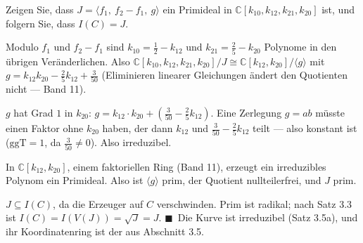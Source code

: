\begin{aufgabe}
Zeigen Sie, dass $J = \langle f_1,\ f_2 - f_1,\ g\rangle$ ein Primideal in $\mathbb C[k_{10}, k_{12}, k_{21}, k_{20}]$ ist, und folgern Sie, dass $I(C) = J$.

\loesung
{}
Modulo $f_1$ und $f_2 - f_1$ sind $k_{10} = \tfrac12 - k_{12}$ und $k_{21} = \tfrac25 - k_{20}$ Polynome in den übrigen Veränderlichen. Also $\mathbb C[k_{10}, k_{12}, k_{21}, k_{20}]/J\cong\mathbb C[k_{12}, k_{20}]/\langle g\rangle$ mit $g = k_{12}k_{20} - \tfrac25k_{12} + \tfrac{3}{50}$ (Eliminieren linearer Gleichungen ändert den Quotienten nicht --- Band 11).

$g$ hat Grad $1$ in $k_{20}$: $g = k_{12}\cdot k_{20} + (\tfrac{3}{50} - \tfrac25k_{12})$. Eine Zerlegung $g = ab$ müsste einen Faktor ohne $k_{20}$ haben, der dann $k_{12}$ und $\tfrac{3}{50} - \tfrac25k_{12}$ teilt --- also konstant ist ($\mathrm{ggT} = 1$, da $\tfrac{3}{50}\ne0$). Also irreduzibel.

In $\mathbb C[k_{12}, k_{20}]$, einem faktoriellen Ring (Band 11), erzeugt ein irreduzibles Polynom ein Primideal. Also ist $\langle g\rangle$ prim, der Quotient nullteilerfrei, und $J$ prim.

$J\subseteq I(C)$, da die Erzeuger auf $C$ verschwinden. Prim ist radikal; nach Satz 3.3 ist $I(C) = I(V(J)) = \sqrt J = J$. $\blacksquare$\ Die Kurve ist irreduzibel (Satz 3.5a), und ihr Koordinatenring ist der aus Abschnitt 3.5.

\begin{center}
\begin{minipage}{0.88\textwidth}
\end{minipage}
\end{center}
\end{aufgabe}

